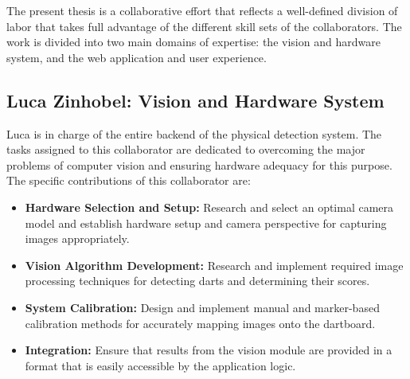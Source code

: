 The present thesis is a collaborative effort that reflects a well-defined division of labor that takes full advantage of the different skill sets of the collaborators. The work is divided into two main domains of expertise: the vision and hardware system, and the web application and user experience.

\subsection{Luca Zinhobel: Vision and Hardware System}
Luca is in charge of the entire backend of the physical detection system. The tasks assigned to this collaborator are dedicated to overcoming the major problems of computer vision and ensuring hardware adequacy for this purpose. The specific contributions of this collaborator are:
\begin{itemize}
    \item \textbf{Hardware Selection and Setup:} Research and select an optimal camera model and establish hardware setup and camera perspective for capturing images appropriately.
    \item \textbf{Vision Algorithm Development:} Research and implement required image processing techniques for detecting darts and determining their scores.
    \item \textbf{System Calibration:} Design and implement manual and marker-based calibration methods for accurately mapping images onto the dartboard.
    \item \textbf{Integration:} Ensure that results from the vision module are provided in a format that is easily accessible by the application logic.
\end{itemize}

